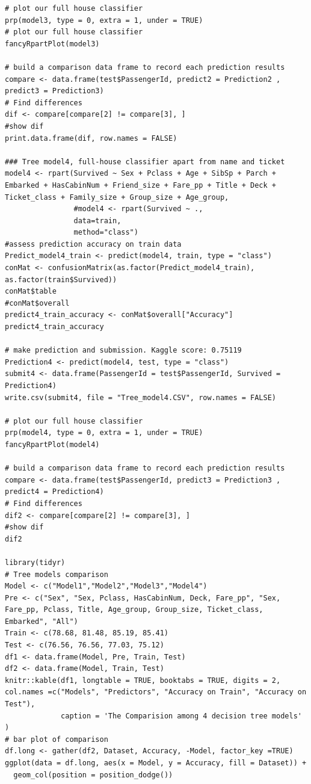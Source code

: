 \documentclass[
]{book}
\begin{document}
\begin{verbatim}
# plot our full house classifier
prp(model3, type = 0, extra = 1, under = TRUE)
# plot our full house classifier
fancyRpartPlot(model3)

# build a comparison data frame to record each prediction results
compare <- data.frame(test$PassengerId, predict2 = Prediction2 , predict3 = Prediction3)
# Find differences
dif <- compare[compare[2] != compare[3], ]
#show dif
print.data.frame(dif, row.names = FALSE)

### Tree model4, full-house classifier apart from name and ticket
model4 <- rpart(Survived ~ Sex + Pclass + Age + SibSp + Parch + Embarked + HasCabinNum + Friend_size + Fare_pp + Title + Deck + Ticket_class + Family_size + Group_size + Age_group,
                #model4 <- rpart(Survived ~ .,
                data=train,
                method="class")
#assess prediction accuracy on train data
Predict_model4_train <- predict(model4, train, type = "class")
conMat <- confusionMatrix(as.factor(Predict_model4_train), as.factor(train$Survived))
conMat$table
#conMat$overall
predict4_train_accuracy <- conMat$overall["Accuracy"]
predict4_train_accuracy

# make prediction and submission. Kaggle score: 0.75119
Prediction4 <- predict(model4, test, type = "class")
submit4 <- data.frame(PassengerId = test$PassengerId, Survived = Prediction4)
write.csv(submit4, file = "Tree_model4.CSV", row.names = FALSE)

# plot our full house classifier
prp(model4, type = 0, extra = 1, under = TRUE)
fancyRpartPlot(model4)

# build a comparison data frame to record each prediction results
compare <- data.frame(test$PassengerId, predict3 = Prediction3 , predict4 = Prediction4)
# Find differences
dif2 <- compare[compare[2] != compare[3], ]
#show dif
dif2

library(tidyr)
# Tree models comparison
Model <- c("Model1","Model2","Model3","Model4")
Pre <- c("Sex", "Sex, Pclass, HasCabinNum, Deck, Fare_pp", "Sex, Fare_pp, Pclass, Title, Age_group, Group_size, Ticket_class, Embarked", "All")
Train <- c(78.68, 81.48, 85.19, 85.41)
Test <- c(76.56, 76.56, 77.03, 75.12)
df1 <- data.frame(Model, Pre, Train, Test)
df2 <- data.frame(Model, Train, Test)
knitr::kable(df1, longtable = TRUE, booktabs = TRUE, digits = 2, col.names =c("Models", "Predictors", "Accuracy on Train", "Accuracy on Test"),
             caption = 'The Comparision among 4 decision tree models'
)
# bar plot of comparison
df.long <- gather(df2, Dataset, Accuracy, -Model, factor_key =TRUE)
ggplot(data = df.long, aes(x = Model, y = Accuracy, fill = Dataset)) +
  geom_col(position = position_dodge())


\end{verbatim}
\end{document}
